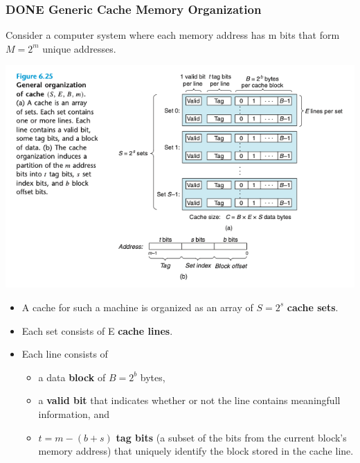 \documentclass[11pt]{article}
\begin{document}
\subsubsection{{\bfseries\sffamily DONE} Generic Cache Memory Organization}
\label{sec:org72a1ebe}
Consider a computer system where each memory address has m bits that form \(M=2^m\) unique addresses.\\

\begin{center}
\includegraphics[width=.9\linewidth]{pics/figure6.25-general-organization-of-cache.png}
\end{center}

\begin{itemize}
\item A cache for such a machine is organized as an array of \(S = 2^s\) \textbf{cache sets}.\\
\item Each set consists of E \textbf{cache lines}.\\
\item Each line consists of\\
\begin{itemize}
\item a data \textbf{block} of \(B = 2^b\) bytes,\\
\item a \textbf{valid bit} that indicates whether or not the line contains meaningfull information, and\\
\item \(t = m-(b+s)\) \textbf{tag bits} (a subset of the bits from the current block's memory address) that uniquely identify the block stored in the cache line.\\
\end{itemize}
\end{itemize}
\end{document}
